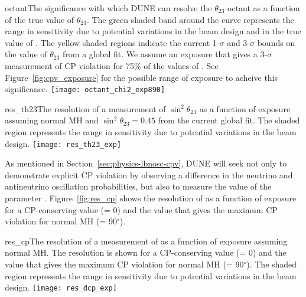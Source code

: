 \begin{cdrfigure}{octant}{The significance with which DUNE can resolve the $\theta_{23}$ octant as a function of the true value of $\theta_{23}$. The green shaded band around the curve represents the range in sensitivity due to potential variations in the beam design and in the true value of \deltacp. The yellow shaded regions indicate the current 1-$\sigma$ and 3-$\sigma$ bounds on the value of $\theta_{23}$ from a global fit.  We assume an exposure that gives a 3-$\sigma$ measurement of CP violation for 75\% of the values of \deltacp.  See Figure~\ref{fig:cpv_exposure} for the possible range of exposure to acheive this significance.}
 \texttt{[image: octant\_chi2\_exp890]}
\end{cdrfigure}

\begin{cdrfigure}{res_th23}{The resolution of a measurement of $\sin^2\theta_{23}$ as a function of exposure assuming normal MH and $\sin^2\theta_{23} = 0.45$ from the current global fit. The shaded region represents the range in sensitivity due to potential variations in the beam design.  }
 \texttt{[image: res\_th23\_exp]}
\end{cdrfigure}


As mentioned in Section~\ref{sec:physics-lbnosc-cpv}, DUNE will seek not only to demonstrate explicit CP violation by observing a difference in the neutrino and antineutrino oscillation probabilities, but also to measure the value of the parameter \deltacp.  Figure~\ref{fig:res_cp} shows the resolution of \deltacp as a function of exposure for a CP-conserving value (\deltacp = 0) and the value that gives the maximum CP violation for normal MH (\deltacp = 90\mbox{$^{\circ}$}).

\begin{cdrfigure}{res_cp}{The resolution of a measurement of \deltacp as a function of exposure assuming normal MH.  The resolution is shown for a CP-conserving value (\deltacp = 0) and the value that gives the maximum CP violation for normal MH (\deltacp = 90\mbox{$^{\circ}$}). The shaded region represents the range in sensitivity due to potential variations in the beam design.  }
 \texttt{[image: res\_dcp\_exp]}
\end{cdrfigure}

